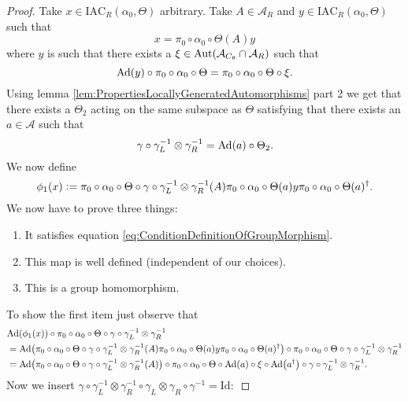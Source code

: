 \documentclass[12pt,a4paper,twoside]{article}
\newcommand{\defeq}{\vcentcolon=}
\let\originalleft\left
\let\originalright\right
\renewcommand{\left}{\mathopen{}\mathclose\bgroup\originalleft}
\renewcommand{\right}{\aftergroup\egroup\originalright}
\renewcommand{\AA}{\mathcal A}
\newcommand{\Ad}[1]{\textrm{Ad}\left(#1\right)}
\newcommand{\Aut}[1]{\textrm{Aut}\left(#1\right)}
\theoremstyle{definition}
\numberwithin{equation}{section}
\begin{document}
\begin{proof}
	Take $x\in \textrm{IAC}_R(\alpha_0,\Theta)$ arbitrary. Take $A\in\AA_R$ and $y\in\textrm{IAC}_R(\alpha_0,\Theta)$ such that
	\begin{equation}
	x=\pi_0\circ\alpha_0\circ\Theta(A)y
	\end{equation}
	where $y$ is such that there exists a $\xi\in\Aut{\AA_{C_\theta}\cap \AA_R}$ such that
	\begin{equation}
	\Ad{y}\circ\pi_0\circ\alpha_0\circ\Theta=\pi_0\circ\alpha_0\circ\Theta\circ\xi.
	\end{equation}
	Using lemma \ref{lem:PropertiesLocallyGeneratedAutomorphisms} part 2 we get that there exists a $\Theta_2$ acting on the same subspace as $\Theta$ satisfying that there exists an $a\in\AA$ such that
	\begin{equation}\label{eq:ConePropertyLemmaDefinitionOfGroupMorphism}
		\gamma\circ\gamma_L^{-1}\otimes\gamma_R^{-1}=\Ad{a}\circ\Theta_2.
	\end{equation}
	We now define
	\begin{equation}
		\phi_1(x)\defeq \pi_0\circ\alpha_0\circ\Theta\circ\gamma\circ\gamma_L^{-1}\otimes\gamma_R^{-1}(A)\pi_0\circ\alpha_0\circ\Theta(a)y\pi_0\circ\alpha_0\circ\Theta(a)^\dagger.
	\end{equation}
	We now have to prove three things:
	\begin{enumerate}
		\item It satisfies equation \eqref{eq:ConditionDefinitionOfGroupMorphism}.
		\item This map is well defined (independent of our choices).
		\item This is a group homomorphism.
	\end{enumerate}
	To show the first item just observe that
	\begin{align}
		&\Ad{\phi_1(x)}\circ\pi_0\circ\alpha_0\circ\Theta\circ\gamma\circ\gamma_L^{-1}\otimes\gamma_R^{-1}\\
		&=\Ad{\pi_0\circ\alpha_0\circ\Theta\circ\gamma\circ\gamma_L^{-1}\otimes\gamma_R^{-1}(A)\pi_0\circ\alpha_0\circ\Theta(a)y\pi_0\circ\alpha_0\circ\Theta(a)^\dagger}\circ\pi_0\circ\alpha_0\circ\Theta\circ\gamma\circ\gamma_L^{-1}\otimes\gamma_R^{-1}\\
		&=\Ad{\pi_0\circ\alpha_0\circ\Theta\circ\gamma\circ\gamma_L^{-1}\otimes\gamma_R^{-1}(A)}\circ\pi_0\circ\alpha_0\circ\Theta\circ\Ad{a}\circ\xi\circ\Ad{a^\dagger}\circ\gamma\circ\gamma_L^{-1}\otimes\gamma_R^{-1}.
	\end{align}
	Now we insert $\gamma\circ\gamma_L^{-1}\otimes\gamma_R^{-1}\circ\gamma_L\otimes\gamma_R\circ\gamma^{-1}=\text{Id}:$

\end{proof}
\end{document}

